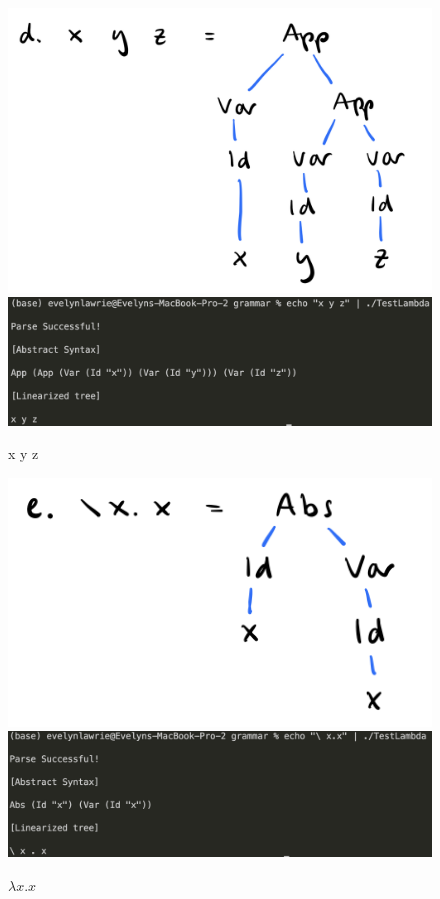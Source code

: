 \documentclass{article}
\theoremstyle{theorem}
\theoremstyle{definition}
\theoremstyle{remark}
\begin{document}
\begin{figure}[H]
\begin{center}
\includegraphics[scale=0.4]{img/dAST.png}
\includegraphics[scale=0.4]{img/ASTd.png}
\end{center}
\caption{x y z}\label{ASTd}
\end{figure}

\begin{figure}[H]
\begin{center}
\includegraphics[scale=0.4]{img/eAST.png}
\\
\includegraphics[scale=0.4]{img/ASTe.png}
\end{center}
\caption{$\lambda x. x$}\label{ASTe}
\end{figure}
\end{document}
